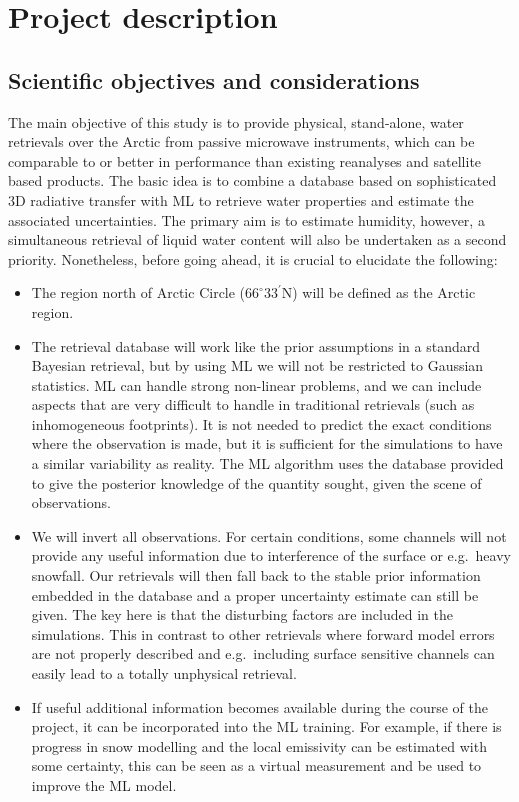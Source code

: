 \documentclass[12pt,oneside,a4paper]{article}
\begin{document}
\section{Project description}
%
\subsection{Scientific objectives and considerations}
The main objective of this study is to provide physical, stand-alone, water
retrievals over the Arctic from passive microwave instruments, which can be
comparable to or better in performance than existing reanalyses and satellite
based products. The basic idea is to combine a database based on sophisticated
3D radiative transfer with ML to retrieve water properties and estimate the
associated uncertainties. The primary aim is to estimate humidity, however, a
simultaneous retrieval of liquid water content will also be undertaken as a
second priority. Nonetheless, before going ahead, it is crucial to elucidate
the following:
\begin{itemize}
 \vspace{-1ex}
\item The region north of Arctic Circle ($66^{\circ}33^{'}$N) will be defined
  as the Arctic region.
 \vspace{-1ex}
\item The retrieval database will work like the prior assumptions in a standard
  Bayesian retrieval, but by using ML we will not be restricted to Gaussian
  statistics. ML can handle strong non-linear problems, and we can include
  aspects that are very difficult to handle in traditional retrievals (such as
  inhomogeneous footprints). It is not needed to predict the exact conditions where the observation is made, but it is sufficient for the simulations to have a
  similar variability as reality. The ML algorithm uses the database provided
  to give the posterior knowledge of the quantity sought, given the scene of
  observations.
 \vspace{-1ex}
\item We will invert all observations. For certain conditions, some channels
	will not provide any useful information due to interference of the surface or
	e.g.\ heavy snowfall. Our retrievals will then fall back to the stable prior
	information embedded in the database and a proper uncertainty estimate can still be given. The key here is that the disturbing 	factors are included in the simulations. This in contrast to other retrievals 	where forward model errors are not properly described and e.g.\ including 	surface sensitive channels can easily lead to a totally unphysical retrieval.
  \vspace{-1ex}
\item If useful additional information becomes available during the course of
  the project, it can be incorporated into the ML training. For example, if
  there is progress in snow modelling and the local emissivity can be estimated
  with some certainty, this can be seen as a virtual measurement and be used to
  improve the ML model.
\end{itemize}
\end{document}

